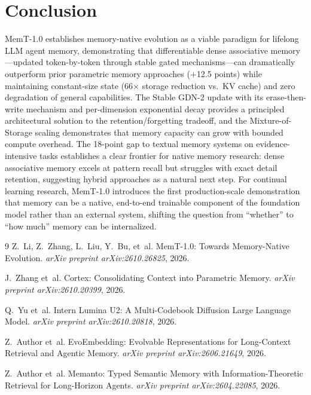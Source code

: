 \documentclass[11pt,a4paper]{article}
\begin{document}
\section{Conclusion}
MemT-1.0 establishes memory-native evolution as a viable paradigm for lifelong LLM agent memory, demonstrating that differentiable dense associative memory---updated token-by-token through stable gated mechanisms---can dramatically outperform prior parametric memory approaches ($+$12.5 points) while maintaining constant-size state (66$\times$ storage reduction vs.\ KV cache) and zero degradation of general capabilities. The Stable GDN-2 update with its erase-then-write mechanism and per-dimension exponential decay provides a principled architectural solution to the retention/forgetting tradeoff, and the Mixture-of-Storage scaling demonstrates that memory capacity can grow with bounded compute overhead. The 18-point gap to textual memory systems on evidence-intensive tasks establishes a clear frontier for native memory research: dense associative memory excels at pattern recall but struggles with exact detail retention, suggesting hybrid approaches as a natural next step. For continual learning research, MemT-1.0 introduces the first production-scale demonstration that memory can be a native, end-to-end trainable component of the foundation model rather than an external system, shifting the question from ``whether'' to ``how much'' memory can be internalized.

\begin{thebibliography}{9}
Z.~Li, Z.~Zhang, L.~Liu, Y.~Bu, et~al.
\newblock MemT-1.0: Towards Memory-Native Evolution.
\newblock \emph{arXiv preprint arXiv:2610.26825}, 2026.

J.~Zhang et~al.
\newblock Cortex: Consolidating Context into Parametric Memory.
\newblock \emph{arXiv preprint arXiv:2610.20399}, 2026.

Q.~Yu et~al.
\newblock Intern Lumina U2: A Multi-Codebook Diffusion Large Language Model.
\newblock \emph{arXiv preprint arXiv:2610.20818}, 2026.

Z.~Author et~al.
\newblock EvoEmbedding: Evolvable Representations for Long-Context Retrieval and Agentic Memory.
\newblock \emph{arXiv preprint arXiv:2606.21649}, 2026.

Z.~Author et~al.
\newblock Memanto: Typed Semantic Memory with Information-Theoretic Retrieval for Long-Horizon Agents.
\newblock \emph{arXiv preprint arXiv:2604.22085}, 2026.
\end{thebibliography}
\end{document}
